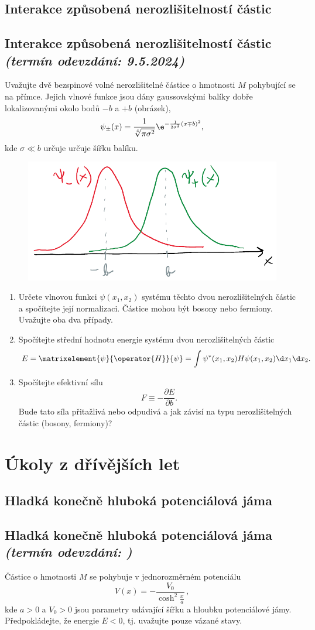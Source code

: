 \documentclass[a4paper,11pt,twoside]{book}
\def\np{\newpage}
\newcommand{\exercise}[2][]{\ifthenelse{\isempty{#1}}
	{\np\section{#2}}
	{\np\section[#2]{{#2} \small{\it{(termín odevzdání: {#1})}}}}
}
\begin{document}
\exercise[9.5.2024]{Interakce způsobená nerozlišitelností částic}
    Uvažujte dvě bezspinové volné nerozlišitelné částice o hmotnosti $M$ pohybující se na přímce.
    Jejich vlnové funkce jsou dány gaussovskými balíky dobře lokalizovanými okolo bodů $-b$ a $+b$ (obrázek),
    \begin{equation}
        \psi_{\pm}(x)=\frac{1}{\sqrt[4]{\pi\sigma^{2}}}\e^{-\frac{1}{2\sigma^{2}}(x\mp b)^{2}},
    \end{equation}
    kde $\sigma\ll b$ určuje určuje šířku balíku.
    
    \begin{figure}[htbp!]
        \centering
        \includegraphics[width=0.5\linewidth]{Identical.png}
    \end{figure}

    \begin{enumerate}
        \item 
            Určete vlnovou funkci $\psi(x_{1},x_{2})$ systému těchto dvou nerozlišitelných částic a spočítejte její normalizaci.
            Částice mohou být bosony nebo fermiony. 
            Uvažujte oba dva případy.
        
        \item Spočítejte střední hodnotu energie systému dvou nerozlišitelných částic
            \begin{equation}
                E=\matrixelement{\psi}{\operator{H}}{\psi}=\int\psi^{*}(x_{1},x_{2})H\psi(x_{1},x_{2})\d x_{1}\d x_{2}.
            \end{equation}

        \item Spočítejte efektivní sílu
            \begin{equation}
                F\equiv-\frac{\partial E}{\partial b}.
            \end{equation}
            Bude tato síla přitažlivá nebo odpudivá a jak závisí na typu nerozlišitelných částic (bosony, fermiony)?
    \end{enumerate}


\appendix
\chapter{Úkoly z dřívějších let}
\exercise{Hladká konečně hluboká potenciálová jáma}
    Částice o hmotnosti $M$ se pohybuje v jednorozměrném potenciálu
    \begin{equation*}
        V(x)=-\frac{V_{0}}{\cosh^{2}\frac{x}{a}}\,,
    \end{equation*}
    kde $a>0$ a $V_{0}>0$ jsou parametry udávající šířku a hloubku potenciálové jámy.
    Předpokládejte, že energie $E<0$, tj. uvažujte pouze vázané stavy.
\end{document}
